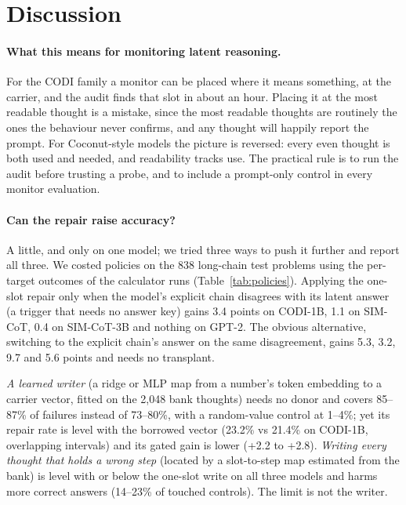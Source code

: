 \documentclass{article}
\begin{document}
\section{Discussion}

\paragraph{What this means for monitoring latent reasoning.} For the CODI family a monitor can be placed where it means something, at the carrier, and the audit finds that slot in about an hour. Placing it at the most readable thought is a mistake, since the most readable thoughts are routinely the ones the behaviour never confirms, and any thought will happily report the prompt. For Coconut-style models the picture is reversed: every even thought is both used and needed, and readability tracks use. The practical rule is to run the audit before trusting a probe, and to include a prompt-only control in every monitor evaluation.

\paragraph{Can the repair raise accuracy?} A little, and only on one model; we tried three ways to push it further and report all three. We costed policies on the 838 long-chain test problems using the per-target outcomes of the calculator runs (Table~\ref{tab:policies}). Applying the one-slot repair only when the model's explicit chain disagrees with its latent answer (a trigger that needs no answer key) gains 3.4 points on CODI-1B, 1.1 on SIM-CoT, 0.4 on SIM-CoT-3B and nothing on GPT-2. The obvious alternative, switching to the explicit chain's answer on the same disagreement, gains 5.3, 3.2, 9.7 and 5.6 points and needs no transplant.

\emph{A learned writer} (a ridge or MLP map from a number's token embedding to a carrier vector, fitted on the 2,048 bank thoughts) needs no donor and covers 85--87\% of failures instead of 73--80\%, with a random-value control at 1--4\%; yet its repair rate is level with the borrowed vector (23.2\% vs 21.4\% on CODI-1B, overlapping intervals) and its gated gain is lower (+2.2 to +2.8). \emph{Writing every thought that holds a wrong step} (located by a slot-to-step map estimated from the bank) is level with or below the one-slot write on all three models and harms more correct answers (14--23\% of touched controls). The limit is not the writer.
\end{document}
